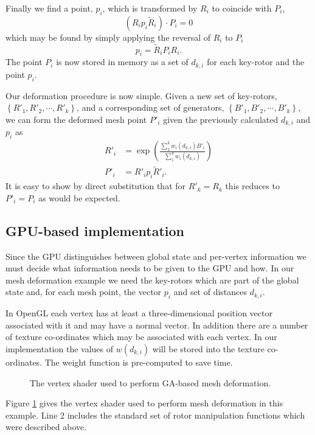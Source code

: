Finally we find a point, $p_i$, which is transformed by $R_i$ to coincide
with $P_i$,
\[
(R_i p_i \tilde{R}_i) \cdot P_i = 0
\]
which may be found by simply applying the reversal of $R_i$ to $P_i$
\[
p_i = \tilde{R}_i P_i R_i.
\]
The point $P_i$ is now stored in memory as a set of $d_{k,i}$ for each
key-rotor and the point $p_i$.

Our deformation procedure is now simple. Given a new set of key-rotors,
$\left\{ R'_1, R'_2, \cdots, R'_k \right\}$, and a corresponding set of
generators, $\left\{B'_1, B'_2, \cdots, B'_k\right\}$, we can form the deformed
mesh point $P'_i$ given the previously calculated $d_{k,i}$ and $p_i$ as
\begin{align}
R'_i &= 
\exp\left(\frac{\sum^{k}_1 w_i(d_{k,i}) B'_i}{\sum^{k}_1 w_i(d_{k,i})}\right) \label{eqn:summation} \\
P'_i &= R'_i p_i \tilde{R}'_i.
\end{align}
It is easy to show by direct substitution that for $R'_k = R_k$ this 
reduces to $P'_i = P_i$ as would be expected.

\subsection{GPU-based implementation}

Since the GPU distinguishes between global state and per-vertex information we
must decide what information needs to be given to the GPU and how. In our mesh
deformation example we need the key-rotors which are part of the global state
and, for each mesh point, the vector $p_i$ and set of distances $d_{k,i}$.

In OpenGL each vertex has at least a three-dimensional position vector associated 
with it and may have a normal vector. In addition there are a number of 
texture co-ordinates which may be associated with each vertex. In our implementation
the values of $w(d_{k,i})$ will be stored into the texture co-ordinates. The weight
function is pre-computed to save time.

\begin{figure}[p]
\centering
\scalebox{0.8}{
\begin{minipage}{\textwidth}
\singlespacing

\end{minipage}}
\caption{\label{fig:meshshader}The vertex shader used to perform GA-based mesh
deformation.}
\end{figure}

Figure \ref{fig:meshshader} gives the vertex shader used to perform mesh deformation in
this example. Line 2 includes the standard set of rotor manipulation functions which
were described above. 

